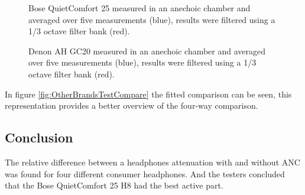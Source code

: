 \begin{figure}[H]
	\centering
	
	\caption{Bose QuietComfort 25 measured in an anechoic chamber and averaged over five measurements (blue), results were filtered using a 1/3 octave filter bank (red).}
	\label{fig:QC25Comp}
\end{figure}

\begin{figure}[H]
	\centering
	
	\caption{Denon AH GC20 measured in an anechoic chamber and averaged over five measurements (blue), results were filtered using a 1/3 octave filter bank (red).}
	\label{fig:DenonComp}
\end{figure}

In figure \autoref{fig:OtherBrandsTestCompare} the fitted comparison can be seen, this representation provides a better overview of the four-way comparison.

%	


\subsection{Conclusion}
The relative difference between a headphones attenuation with and without ANC was found for four different consumer headphones. And the testers concluded that the Bose QuietComfort 25 H8 had the best active part.




